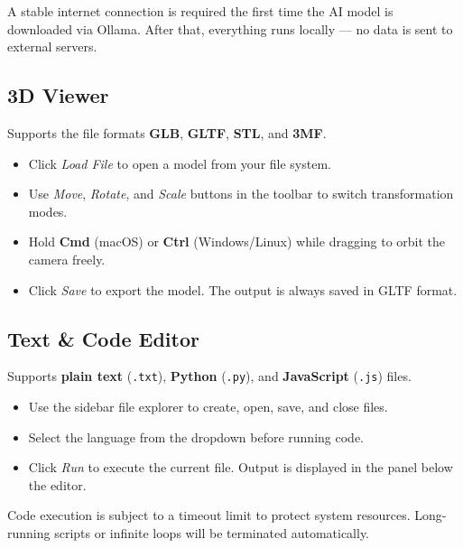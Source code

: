 \documentclass[a4paper,12pt]{article}
\begin{document}
\begin{notebox}
A stable internet connection is required the first time the AI model is downloaded via Ollama. After that, everything runs locally — no data is sent to external servers.
\end{notebox}
 
\subsection{3D Viewer}
 
Supports the file formats \textbf{GLB}, \textbf{GLTF}, \textbf{STL}, and \textbf{3MF}.
 
\begin{itemize}[leftmargin=1.5em]
    \item Click \textit{Load File} to open a model from your file system.
    \item Use \textit{Move}, \textit{Rotate}, and \textit{Scale} buttons in the toolbar to switch transformation modes.
    \item Hold \textbf{Cmd} (macOS) or \textbf{Ctrl} (Windows/Linux) while dragging to orbit the camera freely.
    \item Click \textit{Save} to export the model. The output is always saved in GLTF format.
\end{itemize}
 
\subsection{Text \& Code Editor}
 
Supports \textbf{plain text} (\texttt{.txt}), \textbf{Python} (\texttt{.py}), and \textbf{JavaScript} (\texttt{.js}) files.
 
\begin{itemize}[leftmargin=1.5em]
    \item Use the sidebar file explorer to create, open, save, and close files.
    \item Select the language from the dropdown before running code.
    \item Click \textit{Run} to execute the current file. Output is displayed in the panel below the editor.
\end{itemize}
 
\begin{warnbox}
Code execution is subject to a timeout limit to protect system resources. Long-running scripts or infinite loops will be terminated automatically.
\end{warnbox}
 
\end{document}
